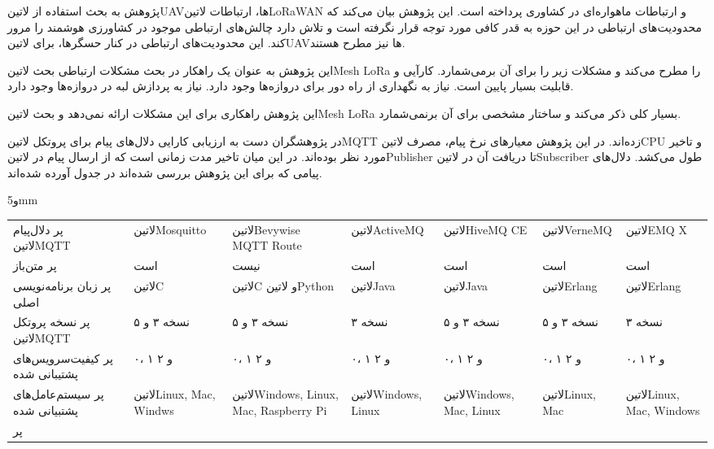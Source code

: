 
پژوهش  به بحث استفاده از ‌لاتین{UAV}ها، ارتباطات ‌لاتین{LoRaWAN} و ارتباطات ماهواره‌ای در کشاوری پرداخته است.
این پژوهش بیان می‌کند که محدودیت‌های ارتباطی در این حوزه به قدر کافی مورد توجه قرار نگرفته است و تلاش دارد چالش‌های ارتباطی موجود در کشاورزی هوشمند را مرور کند.
این محدودیت‌های ارتباطی در کنار حسگرها، برای ‌لاتین{UAV}ها نیز مطرح هستند.

این پژوهش به عنوان یک راهکار در بحث مشکلات ارتباطی بحث ‌لاتین{Mesh LoRa} را مطرح می‌کند و مشکلات زیر را برای آن برمی‌شمارد.
 کارآیی و قابلیت بسیار پایین است.
 نیاز به نگهداری از راه دور برای دروازه‌ها وجود دارد.
 نیاز به پردازش لبه در دروازه‌ها وجود دارد.

این پژوهش راهکاری برای این مشکلات ارائه نمی‌دهد و بحث ‌لاتین{Mesh LoRa} بسیار کلی ذکر می‌کند و ساختار مشخصی برای آن برنمی‌شمارد.


در  پژوهشگران دست به ارزیابی کارایی دلال‌های پیام برای پروتکل ‌لاتین{MQTT} زده‌اند. در این پژوهش معیارهای نرخ پیام، مصرف ‌لاتین{CPU} و تاخیر مورد نظر بوده‌اند.
در این میان تاخیر مدت زمانی است که از ارسال پیام در ‌لاتین{Publisher} تا دریافت آن در ‌لاتین{Subscriber} طول می‌کشد.
دلال‌های پیامی که برای این پژوهش بررسی شده‌اند در جدول  آورده شده‌اند.

‌و{5mm}
\begin{tabularx}
  {\textwidth}
  {p{3cm}*6{X}}
‌پر
دلال‌پیام ‌لاتین{MQTT} & ‌لاتین{Mosquitto} & ‌لاتین{Bevywise MQTT Route} & ‌لاتین{ActiveMQ} & ‌لاتین{HiveMQ CE} & ‌لاتین{VerneMQ} & ‌لاتین{EMQ X} \\
‌پر
متن‌باز & است & نیست & است & است & است & است \\
‌پر
زبان برنامه‌نویسی اصلی & ‌لاتین{C} & ‌لاتین{C} و ‌لاتین{Python} & ‌لاتین{Java} & ‌لاتین{Java} & ‌لاتین{Erlang} & ‌لاتین{Erlang} \\
‌پر
نسخه پروتکل ‌لاتین{MQTT} & نسخه ۳ و ۵ & نسخه ۳ و ۵ & نسخه ۳ & نسخه ۳ و ۵ & نسخه ۳ و ۵ & نسخه ۳ \\
‌پر
کیفیت‌سرویس‌های پشتیبانی شده & ۰، ۱ و ۲ & ۰، ۱ و ۲ & ۰، ۱ و ۲ & ۰، ۱ و ۲ & ۰، ۱ و ۲ & ۰، ۱ و ۲ \\
‌پر
سیستم‌عامل‌های پشتبیانی شده & ‌لاتین{Linux, Mac, Windws} & ‌لاتین{Windows, Linux, Mac, Raspberry Pi} & ‌لاتین{Windows, Linux} & ‌لاتین{Windows, Mac, Linux} & ‌لاتین{Linux, Mac} & ‌لاتین{Linux, Mac, Windows} \\
‌پر
\end{tabularx}

